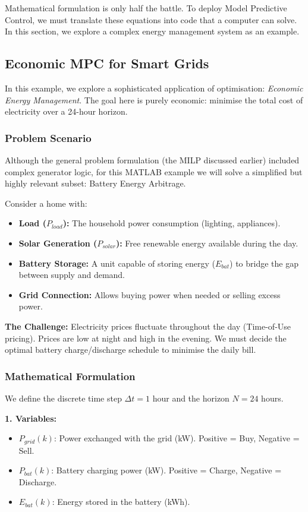 Mathematical formulation is only half the battle. To deploy Model Predictive Control, we must translate these equations into code that a computer can solve. In this section, we explore a complex energy management system as an example.


\subsection{Economic MPC for Smart Grids}

In this  example, we explore a sophisticated application of optimisation: \emph{Economic Energy Management}.  The goal here is purely economic: minimise the total cost of electricity over a 24-hour horizon.

\subsubsection{Problem Scenario}
Although the general problem formulation (the MILP discussed earlier) included complex generator logic, for this MATLAB example we will solve a simplified but highly relevant subset: {Battery Energy Arbitrage}.

Consider a home with:
\begin{itemize}
	\item \textbf{Load ($P_{load}$):} The household power consumption (lighting, appliances).
	\item \textbf{Solar Generation ($P_{solar}$):} Free renewable energy available during the day.
	\item \textbf{Battery Storage:} A unit capable of storing energy ($E_{bat}$) to bridge the gap between supply and demand.
	\item \textbf{Grid Connection:} Allows buying power when needed or selling excess power.
\end{itemize}

\textbf{The Challenge:} Electricity prices fluctuate throughout the day (Time-of-Use pricing). Prices are low at night and high in the evening. We must decide the optimal battery charge/discharge schedule to minimise the daily bill.

\subsubsection{Mathematical Formulation}
We define the discrete time step $\Delta t = 1$ hour and the horizon $N=24$ hours.

\textbf{1. Variables:}
\begin{itemize}
	\item $P_{grid}(k)$: Power exchanged with the grid (kW). Positive = Buy, Negative = Sell.
	\item $P_{bat}(k)$: Battery charging power (kW). Positive = Charge, Negative = Discharge.
	\item $E_{bat}(k)$: Energy stored in the battery (kWh).
\end{itemize}

